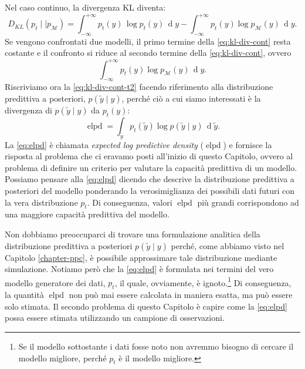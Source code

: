 \documentclass[
  10pt,
  italian,
  a4paper,
  extrafontsizes,onecolumn,openright
  ]{memoir}
\DeclareMathOperator{\elpd}{elpd} %
\theoremstyle{definition}
\theoremstyle{definition}
\theoremstyle{definition}
\theoremstyle{definition}
\theoremstyle{remark}
\begin{document}
Nel caso continuo, la divergenza KL diventa:
\begin{equation}
D_{KL}(p_t \mid\mid p_{\mathcal{M}}) = \int_{-\infty}^{+\infty} p_{t}(y) \,\log p_{t}(y) \,\operatorname {d}\!y - \int_{-\infty}^{+\infty}p_{t}(y)\log p_{\mathcal{M}}(y) \,\operatorname {d}\!y.
\label{eq:kl-div-cont}
\end{equation}
Se vengono confrontati due modelli, il primo termine della \eqref{eq:kl-div-cont} resta costante e il confronto si riduce al secondo termine della \eqref{eq:kl-div-cont}, ovvero
\begin{equation}
\int_{-\infty}^{+\infty}p_{t}(y)\log p_{\mathcal{M}}(y) \,\operatorname {d}\!y.
\label{eq:kl-div-cont-t2}
\end{equation}
\noindent
Riscriviamo ora la \eqref{eq:kl-div-cont-t2} facendo riferimento alla distribuzione predittiva a posteriori, \(p(\tilde{y} \mid y)\), perché ciò a cui siamo interessati è la divergenza di \(p(\tilde{y} \mid y)\) da \(p_{t}(y)\):
\begin{equation}
\elpd = \int_{\tilde{y}} p_{t}(\tilde{y}) \log p(\tilde{y} \mid y) \,\operatorname {d}\!\tilde{y}.
\label{eq:elpd}
\end{equation}
La \eqref{eq:elpd} è chiamata \emph{expected log predictive density} (\(\elpd\)) e fornisce la risposta al problema che ci eravamo posti all'inizio di questo Capitolo, ovvero al problema di definire un criterio per valutare la capacità predittiva di un modello. Possiamo pensare alla \eqref{eq:elpd} dicendo che descrive la distribuzione predittiva a posteriori del modello ponderando la verosimiglianza dei possibili dati futuri con la vera distribuzione \(p_t\). Di conseguenza, valori \(\elpd\) più grandi corrispondono ad una maggiore capacità predittiva del modello.

Non dobbiamo preoccuparci di trovare una formulazione analitica della distribuzione predittiva a posteriori \(p(\tilde{y} \mid y)\) perché, come abbiamo visto nel Capitolo \ref{chapter-ppc}, è possibile approssimare tale distribuzione mediante simulazione. Notiamo però che la \eqref{eq:elpd} è formulata nei termini del vero modello generatore dei dati, \(p_t\), il quale, ovviamente, è ignoto.\footnote{Se il modello sottostante i dati fosse noto non avremmo bisogno di cercare il modello migliore, perché \(p_t\) è il modello migliore.} Di conseguenza, la quantità \(\elpd\) non può mai essere calcolata in maniera esatta, ma può essere solo stimata. Il secondo problema di questo Capitolo è capire come la \eqref{eq:elpd} possa essere stimata utilizzando un campione di osservazioni.
\end{document}
